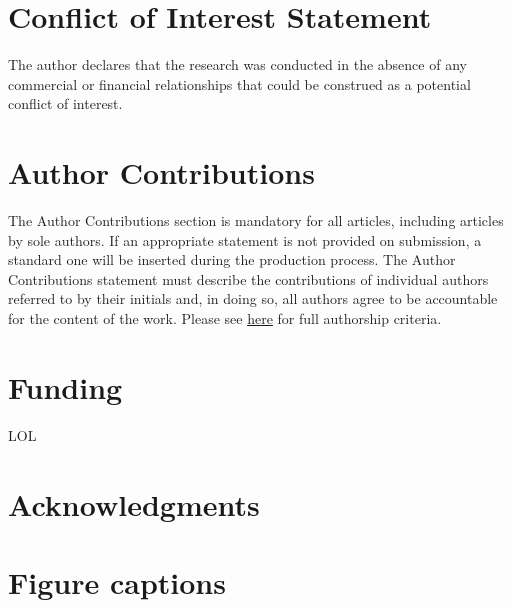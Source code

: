 \documentclass[utf8]{frontiersSCNS} %
\begin{document}
\section*{Conflict of Interest Statement}

The author declares that the research was conducted in the absence of any commercial or financial relationships that could be construed as a potential conflict of interest.

\section*{Author Contributions}

The Author Contributions section is mandatory for all articles, including articles by sole authors. If an appropriate statement is not provided on submission, a standard one will be inserted during the production process. The Author Contributions statement must describe the contributions of individual authors referred to by their initials and, in doing so, all authors agree to be accountable for the content of the work. Please see  \href{http://home.frontiersin.org/about/author-guidelines#AuthorandContributors}{here} for full authorship criteria.

\section*{Funding}
LOL

\section*{Acknowledgments}


 




\section*{Figure captions}

\end{document}
